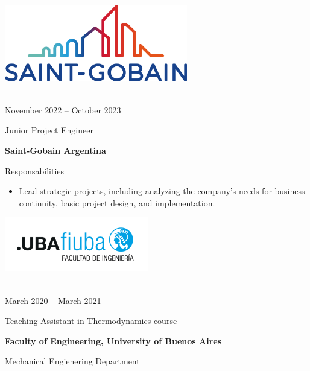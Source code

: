 \documentclass[a4paper,10pt]{article}
\newlength{\cvcolumngapwidth}
\newlength{\cvleftcolumnwidth}
\newlength{\cvrightcolumnwidth}
\newcommand{\cvtitlestyle}[1]{{\large\cvtitlefont\textcolor{cvtitlecolor}{#1}}}
\newcommand{\cvdurationstyle}[1]{{\small\cvdurationfont\textcolor{cvdurationcolor}{#1}}}
\newlength{\cvafteritemskipamount}
\newlength{\cvaftertitleskipamount}
\newlength{\cvparskip}
\newcommand{\cvitem}[2]{
    \begin{minipage}[t]{\cvleftcolumnwidth}
        \raggedleft #1
    \end{minipage}%
    \hspace{\cvcolumngapwidth}%
    \begin{minipage}[t]{\cvrightcolumnwidth}
        \setlength{\parskip}{\cvparskip} #2
    \end{minipage}

    \vspace{\cvafteritemskipamount}
}
\newcommand{\cvtitle}[1]{
    \cvtitlestyle{#1}

    \vspace{\cvaftertitleskipamount}
    \vspace{-\cvparskip}
}
\begin{document}
\cvitem{
 	\begin{minipage}{\textwidth}
   \begin{flushright}
		  \includegraphics[width=0.6\textwidth]{../../../../logos-photos/Logo_SG.png}   
    \end{flushright}  
  \end{minipage} \\
  \vspace{0.3cm}
  \cvdurationstyle{November 2022 -- October 2023}
}{
    \cvtitle{Junior Project Engineer}

    \textbf{\large Saint-Gobain Argentina}
	
  Responsabilities	
    \begin{itemize}
        \item Lead strategic projects, including analyzing the company's needs for business continuity, basic project
          design, and implementation.
    \end{itemize}
	

}

\cvitem{
 	\begin{minipage}{\textwidth}
   \begin{flushright}
		  \includegraphics[height=0.25\textwidth]{../../../../logos-photos/Logo_FIUBA_new.png}   
    \end{flushright}  
  \end{minipage} \\
  \vspace{0.1cm}
  \cvdurationstyle{March 2020 -- March 2021}
}{
    \cvtitle{Teaching Assistant in Thermodynamics course}

    \textbf{\large Faculty of Engineering, University of Buenos Aires}

    Mechanical Engienering Department
}
\end{document}
